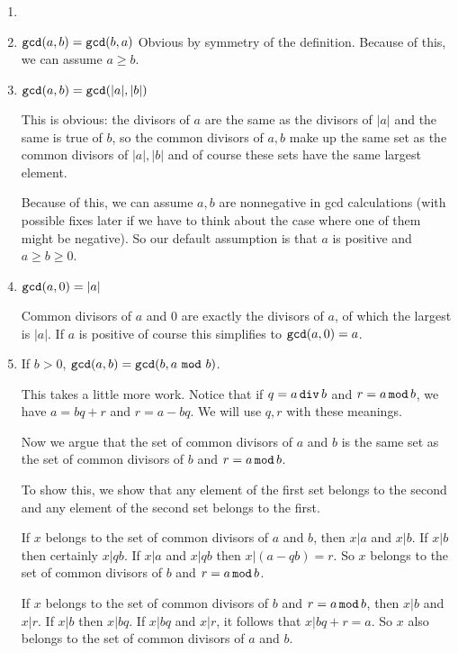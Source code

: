 \documentclass[12pt]{article}
\begin{document}
\begin{description}
\begin{enumerate}\item[ ]

\item ${\tt gcd}(a,b) = {\tt gcd}(b,a)$  Obvious by symmetry of the definition.  Because of this, we can assume $a \geq b$.

\item ${\tt gcd}(a,b)={\tt gcd}(|a|,|b|)$

This is obvious:  the divisors of $a$ are the same as the divisors of $|a|$ and the same is true of $b$, so the common divisors of $a,b$ make up the same set as the common divisors of $|a|,|b|$ and of course these sets have the same largest element.

Because of this, we can assume $a,b$ are nonnegative in gcd calculations (with possible fixes later if we have to think about the case where one of them might be negative).  So our default assumption is that $a$ is positive and $a \geq b \geq 0$.

\item ${\tt gcd}(a,0) = |a|$

Common divisors of $a$ and 0 are exactly the divisors of $a$, of which the largest is $|a|$.  If $a$ is positive
of course this simplifies to ${\tt gcd}(a,0) = a$.

\item If $b > 0$, ${\tt gcd}(a,b) = {\tt gcd}(b,a\,\,{\tt mod} \,\, b)$.

This takes a little more work.  Notice that if $q=a\,{\tt div} \, b$ and $r = a \,{\tt mod} \, b$, we have $a=bq+r$ and
$r=a-bq$.  We will use $q,r$ with these meanings.

Now we argue that the set of common divisors of $a$ and $b$ is the same set as the set of common divisors of $b$ and $r=a \,{\tt mod} \, b$.

To show this, we show that any element of the first set belongs to the second and any element of the second set belongs to the first.

If $x$ belongs to the set of common divisors of $a$ and $b$, then $x|a$ and $x|b$.  If $x|b$ then certainly $x | qb$.
If $x|a$ and $x|qb$ then $x |(a-qb)=r$.   So $x$ belongs to the set of common divisors of $b$ and $r=a\,{\tt mod} \,b$.

If $x$ belongs to the set of common divisors of $b$ and $r=a\,{\tt mod} \,b$, then $x|b$ and $x|r$.  If $x|b$ then $x|bq$.  
If $x|bq$ and $x|r$, it follows that $x|bq+r=a$.  So $x$ also belongs to the set of common divisors of $a$ and $b$.


\end{enumerate}
\end{description}
\end{document}

